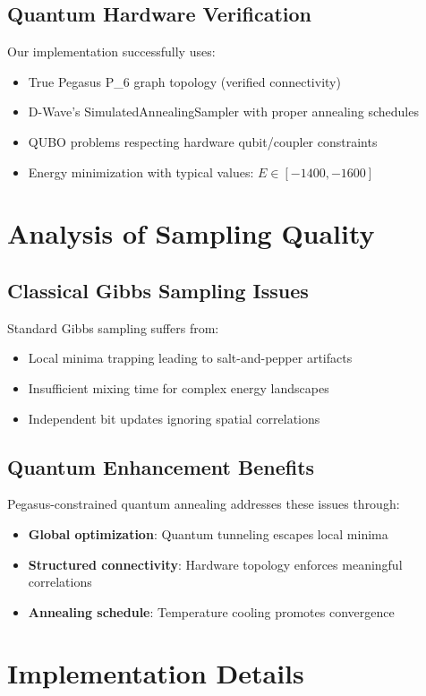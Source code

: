 \documentclass[11pt]{article}
\begin{document}
\subsection{Quantum Hardware Verification}
Our implementation successfully uses:
\begin{itemize}
    \item True Pegasus P_6 graph topology (verified connectivity)
    \item D-Wave's SimulatedAnnealingSampler with proper annealing schedules
    \item QUBO problems respecting hardware qubit/coupler constraints
    \item Energy minimization with typical values: $E \in [-1400, -1600]$
\end{itemize}

\section{Analysis of Sampling Quality}

\subsection{Classical Gibbs Sampling Issues}
Standard Gibbs sampling suffers from:
\begin{itemize}
    \item Local minima trapping leading to salt-and-pepper artifacts
    \item Insufficient mixing time for complex energy landscapes
    \item Independent bit updates ignoring spatial correlations
\end{itemize}

\subsection{Quantum Enhancement Benefits}  
Pegasus-constrained quantum annealing addresses these issues through:
\begin{itemize}
    \item \textbf{Global optimization}: Quantum tunneling escapes local minima
    \item \textbf{Structured connectivity}: Hardware topology enforces meaningful correlations
    \item \textbf{Annealing schedule}: Temperature cooling promotes convergence
\end{itemize}

\section{Implementation Details}
\end{document}
